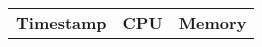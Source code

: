 \begin{table}[h]
\begin{tabular}{c c c}
\textbf{Timestamp}& \textbf{CPU} & \textbf{Memory}\\

\end{tabular}
    \label{tab1}
\end{table}
